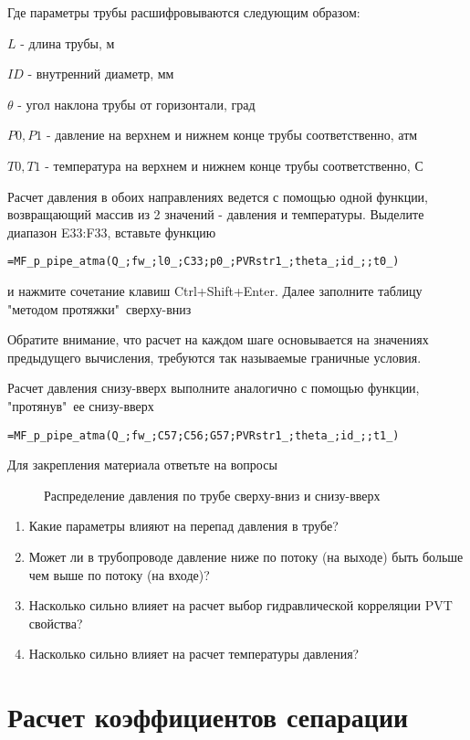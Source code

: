 Где параметры трубы расшифровываются следующим образом:

$L$ - длина трубы, м

$ID$ - внутренний диаметр, мм

$\theta$ - угол наклона трубы от горизонтали, град

$P0, P1$ - давление на верхнем и нижнем конце трубы соответственно, атм

$T0, T1$  - температура на верхнем и нижнем конце трубы соответственно, С

Расчет давления в обоих направлениях ведется с помощью одной функции, возвращающий массив из 2 значений - давления и температуры. Выделите диапазон E33:F33, вставьте функцию

{ \small  \texttt{=MF\_p\_pipe\_atma(Q\_;fw\_;l0\_;C33;p0\_;PVRstr1\_;theta\_;id\_;;t0\_)
}}

и нажмите сочетание клавиш Ctrl+Shift+Enter. Далее заполните таблицу "методом протяжки"\ сверху-вниз

Обратите внимание, что расчет на каждом шаге основывается на значениях предыдущего вычисления, требуются так называемые граничные условия. 

Расчет давления снизу-вверх выполните аналогично с помощью функции, "протянув"\ ее снизу-вверх

{ \small  \texttt{=MF\_p\_pipe\_atma(Q\_;fw\_;C57;C56;G57;PVRstr1\_;theta\_;id\_;;t1\_)
}}

Для закрепления материала ответьте на вопросы

\begin{figure}[h!]
	\center{\texttt{[image: Ex50\_2]}}
	\caption{Распределение давления по трубе сверху-вниз и снизу-вверх}
	\label{ris:Ex50_2}
\end{figure}

\begin{enumerate}
	\item Какие параметры влияют на перепад давления в трубе?
	\item Может ли в трубопроводе давление ниже по потоку (на выходе) быть больше чем выше по потоку (на входе)?
	\item Насколько сильно влияет на расчет выбор гидравлической корреляции PVT свойства?
	\item Насколько сильно влияет на расчет температуры давления?
\end{enumerate}

\section{Расчет коэффициентов сепарации}

